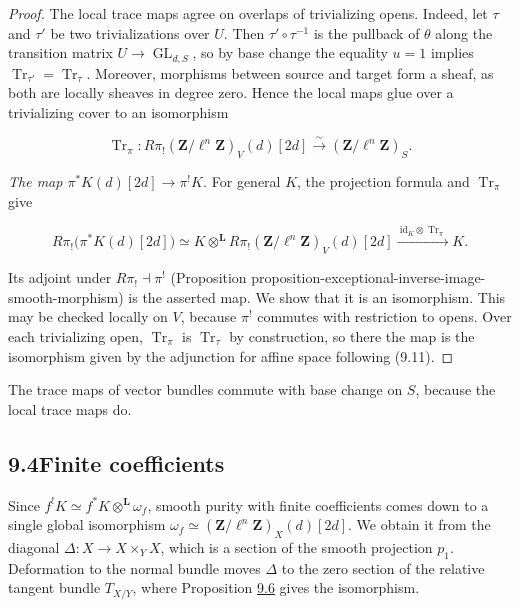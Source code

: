 \documentclass[11pt]{article}
\providecommand{\GL}{}\renewcommand{\GL}{\operatorname{GL}}
\begin{document}
\begin{proof}[{Proof}]
The local trace maps agree on overlaps of trivializing opens. Indeed, let \(\tau\) and \(\tau'\) be two trivializations over \(U\). Then \(\tau'\circ\tau^{-1}\) is the pullback of \(\theta\) along the transition matrix \(U\to\GL_{d,S}\), so by base change the equality \(u=1\) implies \(\operatorname{Tr}_{\tau'}=\operatorname{Tr}_{\tau}\). Moreover, morphisms between source and target form a sheaf, as both are locally sheaves in degree zero. Hence the local maps glue over a trivializing cover to an isomorphism

\[
\operatorname{Tr}_{\pi}:
R\pi_!(\mathbf Z/\ell^n\mathbf Z)_V(d)[2d]
\xrightarrow{\sim}(\mathbf Z/\ell^n\mathbf Z)_S.
\]

\emph{The map \(\pi^*K(d)[2d]\to\pi^!K\).} For general \(K\), the projection formula and \(\operatorname{Tr}_\pi\) give

\[
R\pi_!\bigl(\pi^{*}K(d)[2d]\bigr)
\simeq K\otimes^{\mathbf L} R\pi_!(\mathbf Z/\ell^n\mathbf Z)_V(d)[2d]
\xrightarrow{\ \mathrm{id}_K\otimes\operatorname{Tr}_{\pi}\ }K.
\]

Its adjoint under \(R\pi_!\dashv\pi^{!}\) (Proposition proposition-exceptional-inverse-image-smooth-morphism) is the asserted map. We show that it is an isomorphism. This may be checked locally on \(V\), because \(\pi^!\) commutes with restriction to opens. Over each trivializing open, \(\operatorname{Tr}_\pi\) is \(\operatorname{Tr}_\tau\) by construction, so there the map is the isomorphism given by the adjunction for affine space following (9.11).
\end{proof}

\label{bp21}%
The trace maps of vector bundles commute with base change on \(S\), because the local trace maps do.


\subsection*{\texorpdfstring{9.4\quad Finite coefficients}{9.4 Finite coefficients}}
\label{bp22}%
\label{bp23}%
Since \(f^!K\simeq f^*K\otimes^{\mathbf L}\omega_f\), smooth purity with finite coefficients comes down to a single global isomorphism \(\omega_f\simeq(\mathbf Z/\ell^n\mathbf Z)_X(d)[2d]\). We obtain it from the diagonal \(\Delta:X\to X\times_YX\), which is a section of the smooth projection \(p_1\). Deformation to the normal bundle moves \(\Delta\) to the zero section of the relative tangent bundle \(T_{X/Y}\), where Proposition \hyperref[bp19]{9.6} gives the isomorphism.
\end{document}
